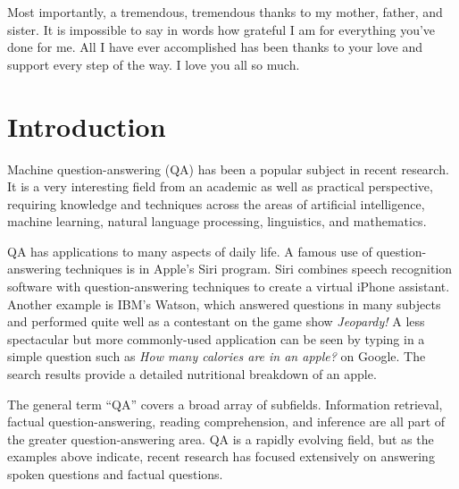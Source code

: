 \documentclass[pageno]{final_paper}
\begin{document}
Most importantly, a tremendous, tremendous thanks to my mother, father, and
sister. It is impossible to say in words how grateful I am for everything you've
done for me. All I have ever accomplished has been thanks to your love and
support every step of the way. I love you all so much.

\newpage

\restoregeometry
{\large \tableofcontents}
\newpage
%
%

\thispagestyle{empty}
\doublespacing

\section{Introduction}
\label{Introduction}

Machine question-answering (QA) has been a popular subject in recent research.
It is a very interesting field from an academic as well as practical
perspective, requiring knowledge and techniques across the areas of artificial
intelligence, machine learning, natural language processing, linguistics, and
mathematics.

QA has applications to many aspects of daily life. A famous use of
question-answering techniques is in Apple's Siri program. Siri combines speech
recognition software with question-answering techniques to create a virtual
iPhone assistant. Another example is IBM's Watson, which answered questions in
many subjects and performed quite well as a contestant on the game show
\textit{Jeopardy!} A less spectacular but more commonly-used application can be
seen by typing in a simple question such as \textit{How many calories are in an
apple?} on Google. The search results provide a detailed nutritional breakdown
of an apple.

The general term ``QA'' covers a broad array of subfields. Information
retrieval, factual question-answering, reading comprehension, and inference are
all part of the greater question-answering area. QA is a rapidly evolving field,
but as the examples above indicate, recent research has focused extensively on
answering spoken questions and factual questions.
\end{document}
